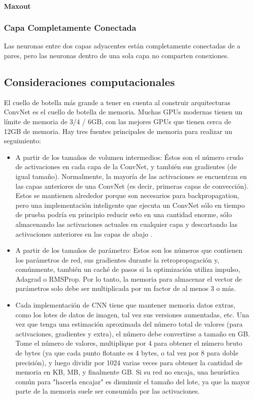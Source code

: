 \documentclass[a4paper,11pt,spanish]{book}
\begin{document}
	\paragraph{Maxout}
      
      \subsubsection{Capa Completamente Conectada} 
	Las neuronas entre dos capas adyacentes están completamente conectadas de a pares, pero las neuronas dentro de una sola capa no comparten conexiones.

    \subsection {Consideraciones computacionales}
      El cuello de botella más grande a tener en cuenta al construir arquitecturas ConvNet es el cuello de botella de memoria. 
      Muchas GPUs modernas tienen un límite de memoria de 3/4 / 6GB, con las mejores GPUs que tienen cerca de 12GB de memoria. 
      Hay tres fuentes principales de memoria para realizar un seguimiento:
      \begin{itemize}
	\item A partir de los tamaños de volumen intermedios: Éstos son el número crudo de activaciones en cada capa de la ConvNet, y también sus gradientes (de igual tamaño). Normalmente, la mayoría de las activaciones se encuentran en las capas anteriores de una ConvNet (es decir, primeras capas de convección). Estos se mantienen alrededor porque son necesarios para backpropagation, pero una implementación inteligente que ejecuta un ConvNet sólo en tiempo de prueba podría en principio reducir esto en una cantidad enorme, sólo almacenando las activaciones actuales en cualquier capa y descartando las activaciones anteriores en las capas de abajo .
	\item A partir de los tamaños de parámetro: Estos son los números que contienen los parámetros de red, sus gradientes durante la retropropagación y, comúnmente, también un caché de pasos si la optimización utiliza impulso, Adagrad o RMSProp. Por lo tanto, la memoria para almacenar el vector de parámetros solo debe ser multiplicada por un factor de al menos 3 o más.
	\item Cada implementación de CNN tiene que mantener memoria datos extras, como los lotes de datos de imagen, tal vez sus versiones aumentadas, etc.
	Una vez que tenga una estimación aproximada del número total de valores (para activaciones, gradientes y extra), el número debe convertirse a tamaño en GB. Tome el número de valores, multiplique por 4 para obtener el número bruto de bytes (ya que cada punto flotante es 4 bytes, o tal vez por 8 para doble precisión), y luego dividir por 1024 varias veces para obtener la cantidad de memoria en KB, MB, y finalmente GB. Si su red no encaja, una heurística común para "hacerla encajar" es disminuir el tamaño del lote, ya que la mayor parte de la memoria suele ser consumida por las activaciones.
      \end{itemize}
\end{document}
